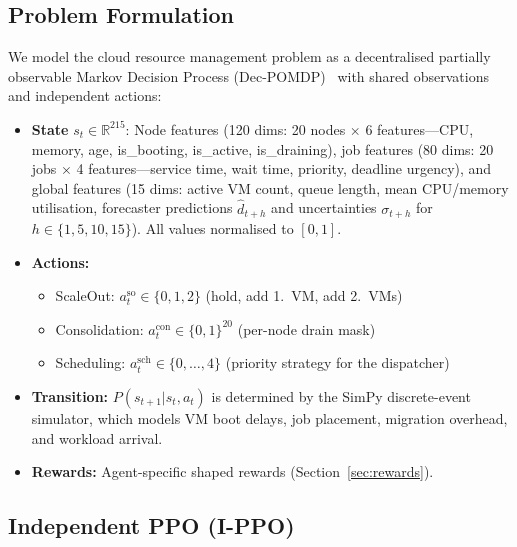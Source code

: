 \documentclass[conference]{IEEEtran}
\begin{document}
\subsection{Problem Formulation}

We model the cloud resource management problem as a decentralised
partially observable Markov Decision Process
(Dec-POMDP)~\cite{oliehoek2016decpomdp} with shared observations and
independent actions:

\begin{itemize}[leftmargin=*]
  \item \textbf{State} $s_t \in \mathbb{R}^{215}$: Node features (120 dims:
        20 nodes $\times$ 6 features---CPU, memory, age, is\_booting,
        is\_active, is\_draining), job features (80 dims: 20 jobs $\times$ 4
        features---service time, wait time, priority, deadline urgency), and
        global features (15 dims: active VM count, queue length, mean CPU/memory
        utilisation, forecaster predictions $\hat{d}_{t+h}$ and uncertainties
        $\sigma_{t+h}$ for $h \in \{1,5,10,15\}$). All values normalised to
        $[0,1]$.
  \item \textbf{Actions:}
    \begin{itemize}
      \item ScaleOut: $a^{\text{so}}_t \in \{0, 1, 2\}$ (hold, add 1.\ VM,
            add 2.\ VMs)
      \item Consolidation: $a^{\text{con}}_t \in \{0,1\}^{20}$ (per-node
            drain mask)
      \item Scheduling: $a^{\text{sch}}_t \in \{0,\ldots,4\}$ (priority
            strategy for the dispatcher)
    \end{itemize}
  \item \textbf{Transition:} $P(s_{t+1}|s_t, a_t)$ is determined by the
        SimPy discrete-event simulator, which models VM boot delays,
        job placement, migration overhead, and workload arrival.
  \item \textbf{Rewards:} Agent-specific shaped rewards (Section~\ref{sec:rewards}).
\end{itemize}

\subsection{Independent PPO (I-PPO)}
\end{document}
